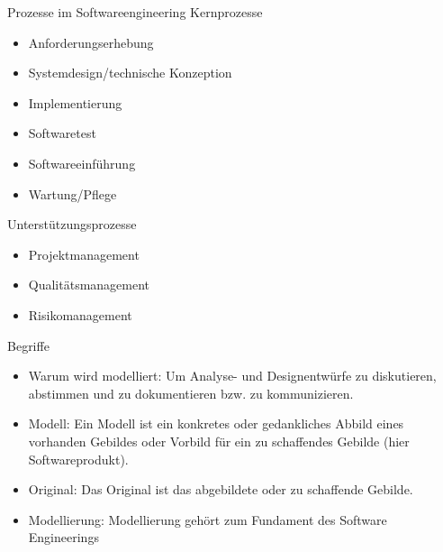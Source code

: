 \begin{theorem}{Prozesse im Softwareengineering Kernprozesse}
\begin{itemize}
  \item Anforderungserhebung
  \item Systemdesign/technische Konzeption
  \item Implementierung
  \item Softwaretest
  \item Softwareeinführung
  \item Wartung/Pflege
\end{itemize}
\end{theorem}

\begin{corollary}{Unterstützungsprozesse}
\begin{itemize}
  \item Projektmanagement
  \item Qualitätsmanagement
  \item Risikomanagement
\end{itemize}
\end{corollary}

\begin{definition}{Begriffe}
  \begin{itemize}
    \item Warum wird modelliert: Um Analyse- und Designentwürfe zu diskutieren, abstimmen und zu dokumentieren bzw. zu kommunizieren.
    \item Modell: Ein Modell ist ein konkretes oder gedankliches Abbild eines vorhanden Gebildes oder Vorbild für ein zu schaffendes Gebilde (hier Softwareprodukt).
    \item Original: Das Original ist das abgebildete oder zu schaffende Gebilde.
    \item Modellierung: Modellierung gehört zum Fundament des Software Engineerings
  \end{itemize}
\end{definition}

